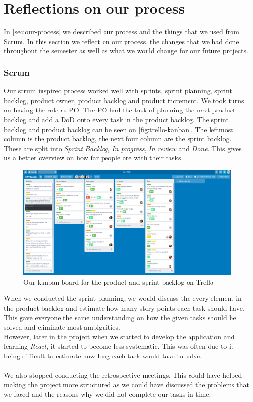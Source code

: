 \section{Reflections on our process}
In \autoref{sec:our-process} we described our process and the things that we used from Scrum.
In this section we reflect on our process, the changes that we had done throughout the semester as well as what we would change for our future projects.

\subsubsection{Scrum}
Our scrum inspired process worked well with sprints, sprint planning, sprint backlog, product owner, product backlog and product increment.
We took turns on having the role as PO.
The PO had the task of planning the next product backlog and add a DoD onto every task in the product backlog.
The sprint backlog and product backlog can be seen on \autoref{fig:trello-kanban}. 
The leftmost column is the product backlog, the next four column are the sprint backlog.
These are split into \textit{Sprint Backlog}, \textit{In progress}, \textit{In review} and \textit{Done}.
This gives us a better overview on how far people are with their tasks.

\begin{figure}[H]
    \centering
    \includegraphics[width=0.8\linewidth]{figures/trellopicture.PNG}
    \caption{Our kanban board for the product and sprint backlog on Trello}
    \label{fig:trello-kanban}
\end{figure}
\noindent
When we conducted the sprint planning, we would discuss the every element in the product backlog and estimate how many story points each task should have.
This gave everyone the same understanding on how the given tasks should be solved and eliminate most ambiguities. 
\\
However, later in the project when we started to develop the application and learning \textit{React}, it started to become less systematic.
This was often due to it being difficult to estimate how long each task would take to solve.
\\\\
We also stopped conducting the retrospective meetings. 
This could have helped making the project more structured as we could have discussed the problems that we faced and the reasons why we did not complete our tasks in time.

